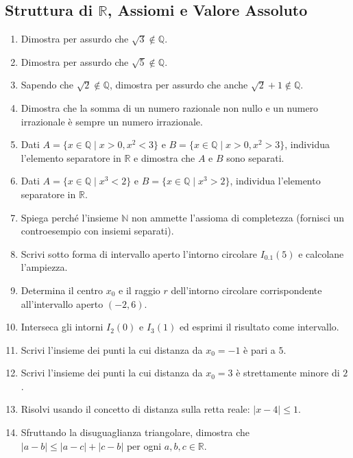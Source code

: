 \subsection{Struttura di $\mathbb{R}$, Assiomi e Valore Assoluto}
\begin{enumerate}
    \item {} Dimostra per assurdo che $\sqrt{3} \notin \mathbb{Q}$.
    \item {} Dimostra per assurdo che $\sqrt{5} \notin \mathbb{Q}$.
    \item {} Sapendo che $\sqrt{2} \notin \mathbb{Q}$, dimostra per assurdo che anche $\sqrt{2} + 1 \notin \mathbb{Q}$.
    \item {} Dimostra che la somma di un numero razionale non nullo e un numero irrazionale è sempre un numero irrazionale.
    \item {} Dati $A=\{x \in \mathbb{Q} \mid x>0, x^2 < 3\}$ e $B=\{x \in \mathbb{Q} \mid x>0, x^2 > 3\}$, individua l'elemento separatore in $\mathbb{R}$ e dimostra che $A$ e $B$ sono separati.
    \item {} Dati $A=\{x \in \mathbb{Q} \mid x^3 < 2\}$ e $B=\{x \in \mathbb{Q} \mid x^3 > 2\}$, individua l'elemento separatore in $\mathbb{R}$.
    \item {} Spiega perché l'insieme $\mathbb{N}$ non ammette l'assioma di completezza (fornisci un controesempio con insiemi separati).
    \item {} Scrivi sotto forma di intervallo aperto l'intorno circolare $I_{0.1}(5)$ e calcolane l'ampiezza.
    \item {} Determina il centro $x_0$ e il raggio $r$ dell'intorno circolare corrispondente all'intervallo aperto $(-2, 6)$.
    \item {} Interseca gli intorni $I_2(0)$ e $I_3(1)$ ed esprimi il risultato come intervallo.
    \item {} Scrivi l'insieme dei punti la cui distanza da $x_0 = -1$ è pari a $5$.
    \item {} Scrivi l'insieme dei punti la cui distanza da $x_0 = 3$ è strettamente minore di $2$.
    \item {} Risolvi usando il concetto di distanza sulla retta reale: $|x - 4| \le 1$.
    \item {} Sfruttando la disuguaglianza triangolare, dimostra che $|a-b| \le |a-c| + |c-b|$ per ogni $a,b,c \in \mathbb{R}$.
\end{enumerate}

